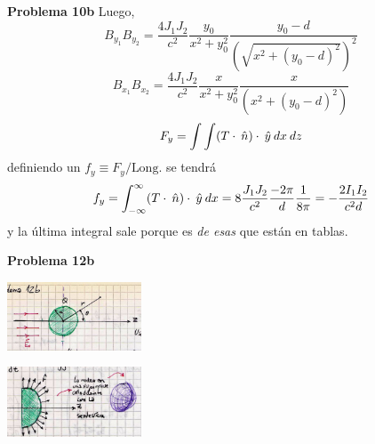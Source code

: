 \documentclass[10pt,oneside]{CBFT_book}
\begin{document}
\begin{ejemplo}{\bf Problema 10b}
Luego,
\[
	B_{y_1} B_{y_2} = \frac{4 J_1 J_2}{c^2} \frac{y_0}{x^2 + y_0^2} 
	\frac{y_0-d}{(\sqrt{x^2+ (y_0-d)^2})^2}
\]
\[
	B_{x_1} B_{x_2} = \frac{4 J_1 J_2}{c^2} 
	\frac{x}{x^2 + y_0^2} \frac{x}{(x^2+ (y_0-d)^2)}
\]
\[
	F_y = \int\int (T\cdot\:\hat{n})\cdot\:\hat{y} \: dx \: dz
\]
definiendo un $f_y \equiv F_y/\text{Long.}$ se tendrá
\[
	f_y = \int_{-\infty}^\infty (T\cdot\:\hat{n})\cdot\:\hat{y} \: dx =
	8 \frac{J_1 J_2}{c^2} \frac{-2\pi}{d} \frac{1}{8\pi} = - \frac{2I_1I_2}{c^2 d}
\]
y la última integral sale porque es {\it de esas} que están en tablas.
 
\end{ejemplo}

\begin{ejemplo}{\bf Problema 12b}

\includegraphics[width=0.3\textwidth]{images/fig_ft1_problema12bA.jpg}

\includegraphics[width=0.3\textwidth]{images/fig_ft1_problema12bB.jpg}
 
\end{ejemplo}
\end{document}

